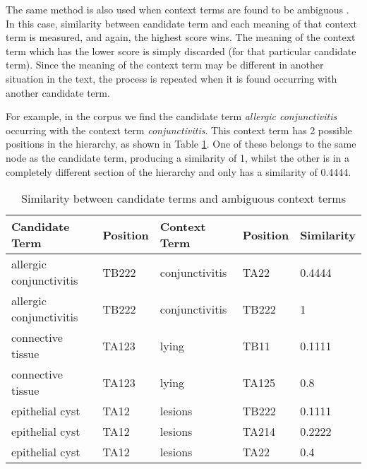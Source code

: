 The same method is also used when context terms are found to be
ambiguous \cite{Maynard98a,Maynard98b}. In this case, similarity between candidate term and each
meaning of that context term is measured, and again, the highest score
wins. The meaning of the context term which has the
lower score is simply discarded (for that particular candidate
term). Since the meaning of the context term may be different in
another situation in the text, the process is repeated when it is
found occurring with another candidate term.

For example, in the corpus we find the candidate term {\it allergic
conjunctivitis} occurring with the context term {\it conjunctivitis}. 
This context term has 2 possible positions in the hierarchy, as shown
in Table \ref{table:context}. One of these belongs to the same node as
the candidate term, producing a similarity of 1, whilst the other is in a
completely different section of the hierarchy and only has a
similarity of 0.4444.

\begin{table}
\begin{center}
 \begin{tabular}{|lllll|}
 \hline
 Candidate Term & Position & Context Term & Position & Similarity\\
 \hline
 allergic conjunctivitis & TB222 & conjunctivitis & TA22 & 0.4444 \\
 allergic conjunctivitis & TB222 & conjunctivitis & TB222 & 1 \\
 \hline
 connective tissue & TA123 & lying & TB11 & 0.1111\\
 connective tissue & TA123 & lying & TA125 & 0.8\\
 \hline
 epithelial cyst & TA12 & lesions & TB222 & 0.1111\\
 epithelial cyst & TA12 & lesions & TA214 & 0.2222\\
 epithelial cyst & TA12 & lesions & TA22 & 0.4 \\
 \hline
 \end{tabular}
\end{center}
\caption{Similarity between candidate terms and ambiguous context terms}
\label{table:context}
\end{table}


